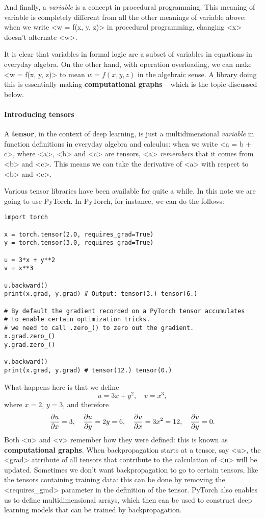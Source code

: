 \documentclass[hyperref, a4paper, 12pt]{report}
\newcommand*{\concept}[1]{{\textbf{#1}}}
\newcommand*{\term}[1]{\textit{#1}}
\def\texttt#1{<#1>}%
\newcommand{\shortcode}[1]{\texttt{#1}}
\begin{document}
And finally, a \term{variable} is a concept in procedural programming.
This meaning of variable is completely different from all the other meanings of variable above:
when we write \shortcode{w = f(x, y, z)} in procedural programming,
changing \shortcode{x} doesn't alternate \shortcode{w}.

It is clear that variables in formal logic are a subset of variables in equations in everyday algebra.
On the other hand, with operation overloading,
we can make \shortcode{w = f(x, y, z)} to mean $w = f(x, y, z)$ in the algebraic sense.
A library doing this is essentially making \concept{computational graphs}
-- which is the topic discussed below.

\paragraph*{Introducing tensors}
A \concept{tensor}, in the context of deep learning,
is just a multidimensional \emph{variable} in function definitions in everyday algebra and calculus:
when we write \shortcode{a = b + c},
where \shortcode{a}, \shortcode{b} and \shortcode{c} are tensors,
\shortcode{a} \emph{remembers} that it comes from \shortcode{b} and \shortcode{c}.
This means we can take the derivative of \shortcode{a} with respect to \shortcode{b} and \shortcode{c}.

Various tensor libraries have been available for quite a while.
In this note we are going to use PyTorch.
In PyTorch, for instance, we can do the follows:

\begin{lstlisting}
import torch

x = torch.tensor(2.0, requires_grad=True)
y = torch.tensor(3.0, requires_grad=True)

u = 3*x + y**2
v = x**3

u.backward()
print(x.grad, y.grad) # Output: tensor(3.) tensor(6.)

# By default the gradient recorded on a PyTorch tensor accumulates
# to enable certain optimization tricks.
# we need to call .zero_() to zero out the gradient. 
x.grad.zero_()
y.grad.zero_()

v.backward()
print(x.grad, y.grad) # tensor(12.) tensor(0.)

\end{lstlisting}

What happens here is that we define 
\[
    u = 3x + y^2, \quad v = x^3,
\]
where $x = 2$, $y = 3$, and therefore 
\[
    \pdv{u}{x} = 3, \quad \pdv{u}{y} = 2y = 6, \quad \pdv{v}{x} = 3x^2 = 12, \quad \pdv{v}{y} = 0.
\]
Both \shortcode{u} and \shortcode{v} remember how they were defined:
this is known as \concept{computational graphs}.
When backpropagation starts at a tensor, say \shortcode{u},
the \shortcode{grad} attribute of all tensors that contribute to the calculation of \shortcode{u}
will be updated.
Sometimes we don't want backpropagation to go to certain tensors,
like the tensors containing training data:
this can be done by removing the \shortcode{requires_grad} parameter in the definition of the tensor.
PyTorch also enables us to define multidimensional arrays,
which then can be used to construct deep learning models that can be trained by backpropagation.
\end{document}
